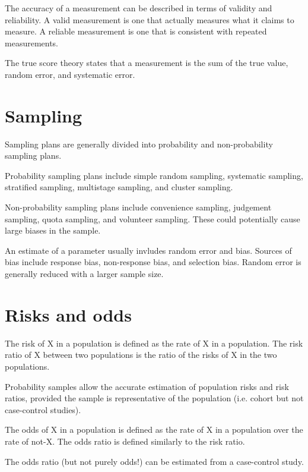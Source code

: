 \documentclass{slnotes}
\begin{document}
The accuracy of a measurement can be described in terms of validity and reliability. A valid measurement is one that actually measures what it claims to measure. A reliable measurement is one that is consistent with repeated measurements.

The true score theory states that a measurement is the sum of the true value, random error, and systematic error.
\chapter{Sampling}
Sampling plans are generally divided into probability and non-probability sampling plans.

Probability sampling plans include simple random sampling, systematic sampling, stratified sampling, multistage sampling, and cluster sampling.

Non-probability sampling plans include convenience sampling, judgement sampling, quota sampling, and volunteer sampling. These could potentially cause large biases in the sample.

An estimate of a parameter usually invludes random error and bias. Sources of bias include response bias, non-response bias, and selection bias. Random error is generally reduced with a larger sample size.
\chapter{Risks and odds}
The risk of X in a population is defined as the rate of X in a population. The risk ratio of X between two populations is the ratio of the risks of X in the two populations.

Probability samples allow the accurate estimation of population risks and risk ratios, provided the sample is representative of the population (i.e. cohort but not case-control studies).

The odds of X in a population is defined as the rate of X in a population over the rate of not-X. The odds ratio is defined similarly to the risk ratio.

The odds ratio (but not purely odds!) can be estimated from a case-control study.
\end{document}

